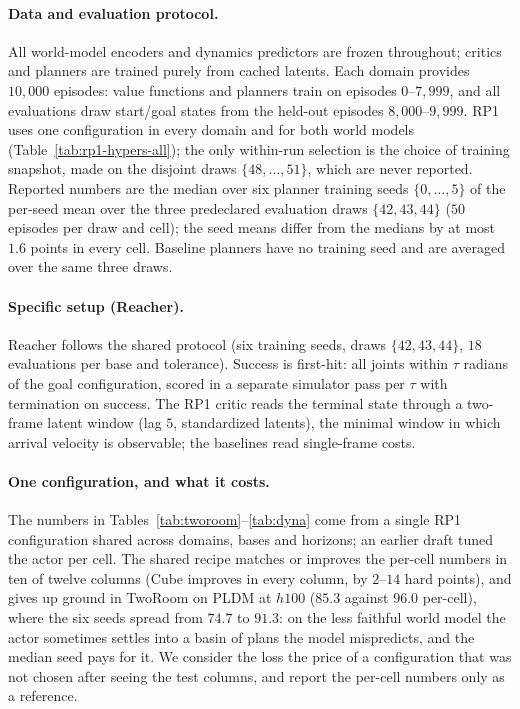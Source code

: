 \paragraph{Data and evaluation protocol.}
All world-model encoders and dynamics predictors are frozen throughout;
critics and planners are trained purely from cached latents. Each domain
provides $10{,}000$ episodes: value functions and planners train on episodes
$0$--$7{,}999$, and all evaluations draw start/goal states from the held-out
episodes $8{,}000$--$9{,}999$. RP1 uses one configuration in every domain
and for both world models (Table~\ref{tab:rp1-hypers-all}); the only
within-run selection is the choice of training snapshot, made on the
disjoint draws $\{48,\ldots,51\}$, which are never reported. Reported
numbers are the median over six planner training seeds $\{0,\ldots,5\}$ of
the per-seed mean over the three predeclared evaluation draws
$\{42,43,44\}$ ($50$ episodes per draw and cell); the seed means differ from
the medians by at most $1.6$ points in every cell. Baseline planners have no
training seed and are averaged over the same three draws.

\paragraph{Specific setup (Reacher).}
Reacher follows the shared protocol (six training seeds, draws
$\{42,43,44\}$, $18$ evaluations per base and tolerance). Success is
first-hit: all joints within $\tau$ radians of the goal configuration,
scored in a separate simulator pass per $\tau$ with termination on success.
The RP1 critic reads the terminal state through a two-frame latent window
(lag $5$, standardized latents), the minimal window in which arrival
velocity is observable; the baselines read single-frame costs.

\paragraph{One configuration, and what it costs.}
The numbers in Tables~\ref{tab:tworoom}--\ref{tab:dyna} come from a single
RP1 configuration shared across domains, bases and horizons; an earlier
draft tuned the actor per cell. The shared recipe matches or improves the
per-cell numbers in ten of twelve columns (Cube improves in every column, by
$2$--$14$ hard points), and gives up ground in TwoRoom on PLDM at $h100$
($85.3$ against $96.0$ per-cell), where the six seeds spread from $74.7$ to
$91.3$: on the less faithful world model the actor sometimes settles into a
basin of plans the model mispredicts, and the median seed pays for it. We
consider the loss the price of a configuration that was not chosen after
seeing the test columns, and report the per-cell numbers only as a
reference.
